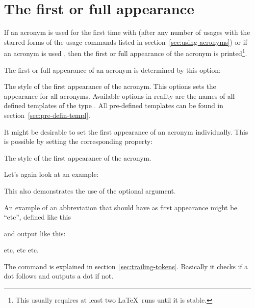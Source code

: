 \documentclass{acro-manual}
\begin{document}
\section{The first or full appearance}\label{sec:first-or-full}
If an acronym is used for the first time with  (after any number of
usages with the starred forms of the usage commands listed in
section~\vref{sec:using-acronyms}) or if an acronym is used , then the
first or full appearance of the acronym is printed\footnote{This usually
  requires at least two \LaTeX\ runs until it is stable.}.

The first or full appearance of an acronym is determined by this option:
\begin{options}
    The style of the first appearance of the acronym. This options sets the
    appearance for all acronyms.  Available options in reality are the names
    of all defined templates of the type . All pre-defined
    templates can be found in section~\vref{sec:pre-defin-templ}.
\end{options}
It might be desirable to set the first appearance of an acronym
individually. This is possible by setting the corresponding property:
\begin{properties}
  \Default
    The style of the first appearance of the acronym.
\end{properties}
Let's again look at an example:
This also demonstrates the use of the optional argument.

An example of an abbreviation that should have  as first appearance
might be \enquote{\acs*{etc}}, defined like this
\begin{sourcecode}
\end{sourcecode}
and output like this:
\begin{example}
  \ac{etc}, \ac{etc} \ac{etc}.
\end{example}
The command  is explained in section~\vref{sec:trailing-tokens}.
Basically it checks if a dot follows and outputs a dot if not.
\end{document}
